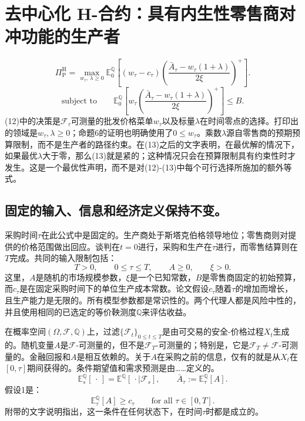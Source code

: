 \documentclass{article}
\begin{document}
\section*{去中心化 H-合约：具有内生性零售商对冲功能的生产者}

\begin{equation}
\Pi_{\mathrm P}^{\mathrm H}
=\max_{w_\tau,\,\lambda\geqslant0}
\mathbb E_0^{\mathbb Q}\left[
(w_\tau-c_\tau)
\left(\frac{\bar A_\tau-w_\tau(1+\lambda)}{2\xi}\right)^+
\right].
\tag{12}
\end{equation}
\begin{equation}
\text{subject to}\qquad
\mathbb E_0^{\mathbb Q}\left[
 w_\tau\left(\frac{\bar A_\tau-w_\tau(1+\lambda)}{2\xi}\right)^+
\right]\leqslant B.
\tag{13}
\end{equation}
(12)中的决策是$\mathscr F_\tau$可测量的批发价格菜单$w_\tau$以及标量$\lambda$在时间零点的选择。打印出的领域是$w_\tau,\lambda\geqslant0$；命题6的证明也明确使用了$0\leqslant w_\tau$。乘数$\lambda$源自零售商的预期预算限制，而不是生产者的路径约束。在(13)之后的文字表明，在最优解的情况下，如果最优$\lambda$大于零，那么(13)就是紧的；这种情况只会在预算限制具有约束性时才发生。这是一个最优性声明，而不是对(12)-(13)中每个可行选择所施加的额外等式。

\subsection*{固定的输入、信息和经济定义保持不变。}

采购时间$\tau$在此公式中是固定的。生产商处于斯塔克伯格领导地位；零售商则对提供的价格范围做出回应。谈判在$t=0$进行，采购和生产在$\tau$进行，而零售结算则在$T$完成。共同的输入限制包括：
\[
T>0,\qquad 0\leqslant\tau\leqslant T,\qquad A\geqslant0,\qquad \xi>0.
\]
这里，$A$是随机的市场规模参数，$\xi$是一个已知常数，$B$是零售商固定的初始预算，而$c_\tau$是在固定采购时间下的单位生产成本常数。论文假设$c_\tau$随着$\tau$的增加而增长，且生产能力是无限的。所有模型参数都是常识性的。两个代理人都是风险中性的，并且使用相同的已选定的等价鞅测度$\mathbb Q$来评估收益。

在概率空间$(\Omega,\mathscr F,\mathbb Q)$上，过滤$\{\mathscr F_t\}_{0\leqslant t\leqslant T}$是由可交易的安全-价格过程$X_t$生成的。随机变量$A$是$\mathscr F$-可测量的，但不是$\mathscr F_T$-可测量的；特别是，它是$\mathscr F_T\ne\mathscr F$-可测量的。金融回报和$A$是相互依赖的。关于$A$在采购之前的信息，仅有的就是从$X_t$在$[0,\tau]$期间获得的。条件期望值和需求预测是由……定义的。
\[
\mathbb E_s^{\mathbb Q}[\,\cdot\,]
=\mathbb E^{\mathbb Q}[\,\cdot\mid\mathscr F_s],
\qquad
\bar A_\tau:=\mathbb E_\tau^{\mathbb Q}[A].
\]
假设1是：
\[
\mathbb E_\tau^{\mathbb Q}[A]\geqslant c_\tau
\qquad\text{for all }\tau\in[0,T].
\]
附带的文字说明指出，这一条件在任何状态下，在时间$\tau$时都是成立的。
\end{document}
